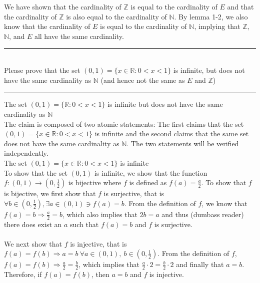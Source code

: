 \documentclass{article}
\begin{document}
\\ \\
We have shown that the cardinality of $\mathbb{Z}$ is equal to the cardinality of $E$ and that the cardinality of $\mathbb{Z}$ is also equal to the cardinality of $\mathbb{N}$. By lemma 1-2, we also know that the cardinality of $E$ is equal to the cardinality of $\mathbb{N}$, implying that $\mathbb{Z}$, $\mathbb{N}$, and $E$ all have the same cardinality.
\\[0.05in] \noindent\rule{\textwidth}{0.4pt}\vspace{0.05in}
\\[0.1in]  Please prove that the set $(0,1) = \{x \in \mathbb{R}: 0 < x < 1\}$ is infinite, but does not have the same cardinality as $\mathbb{N}$ (and hence not the same as $E$ and $\mathbb{Z}$)
\\[0.05in]\noindent\rule{\textwidth}{0.4pt}\vspace{0.05in}
 The set $(0,1) = \{ \mathbb{R} : 0 < x < 1 \}$ is infinite but does not have the same cardinality as $\mathbb{N}$
\\[0.05in] The claim is composed of two atomic statements: The first claims that the set $(0,1) = \{x \in \mathbb{R}: 0 < x < 1\}$ is infinite and the second claims that the same set does not have the same cardinality as $\mathbb{N}$. The two statements will be verified independently.
\\[0.1in]  The set $(0,1) = \{x \in \mathbb{R}: 0 < x < 1 \}$ is infinite 
\\[0.05in] To show that the set $(0,1)$ is infinite, we show that the function $f:(0,1) \rightarrow (0,\frac{1}{2})$ is bijective where $f$ is defined as $f(a) = \frac{a}{2}$. To show that $f$ is bijective, we first show that $f$ is surjective, that is $\forall b \in (0,\frac{1}{2}), \exists a \in (0,1) \ni f(a) = b$. From the definition of $f$, we know that $f(a) = b \Rightarrow \frac{a}{2} = b$, which also implies that $2b = a$ and thus (dumbass reader) there does exist an $a$ such that $f(a) = b$ and $f$ is surjective.  
\\ \\
We next show that $f$ is injective, that is $f(a) = f(b) \Rightarrow a = b \ \forall a \in (0,1), \ b \in (0,\frac{1}{2})$. From the definition of $f$, $f(a) = f(b) \Rightarrow \frac{a}{2} = \frac{b}{2}$, which implies that $\frac{a}{2}\cdot 2 = \frac{b}{2}\cdot 2$ and finally that $a = b$. Therefore, if $f(a) = f(b)$, then $a = b$ and $f$ is injective. 
\end{document}
